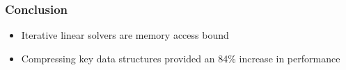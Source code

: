 \documentclass{beamer}
\begin{document}
\begin{frame}
	\frametitle{Conclusion}
	\begin{itemize}
		\item Iterative linear solvers are memory access bound
		\item Compressing key data structures provided an 84\% increase in performance
	\end{itemize}
\end{frame}
\end{document}
